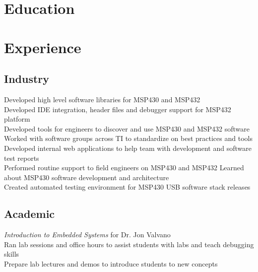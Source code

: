 \documentclass[11pt,a4paper,sans]{moderncv}        %
\begin{document}
\vspace*{-5\baselineskip}
\makecvtitle
\vspace*{-3\baselineskip}
\section{Education}

\section{Experience}

\subsection{Industry}
{Developed high level software libraries for MSP430 and MSP432\\
Developed IDE integration, header files and debugger support for MSP432 platform\\
Developed tools for engineers to discover and use MSP430 and MSP432 software\\
Worked with software groups across TI to standardize on best practices and tools\\
Developed internal web applications to help team with development and software test reports\\
Performed routine support to field engineers on MSP430 and MSP432}
{Learned about MSP430 software development and architecture\\
Created automated testing environment for MSP430 USB software stack releases}

\subsection{Academic}
{\textit{Introduction to Embedded Systems} for Dr. Jon Valvano\\
Ran lab sessions and office hours to assist students with labs and teach debugging skills\\
Prepare lab lectures and demos to introduce students to new concepts}
\end{document}
